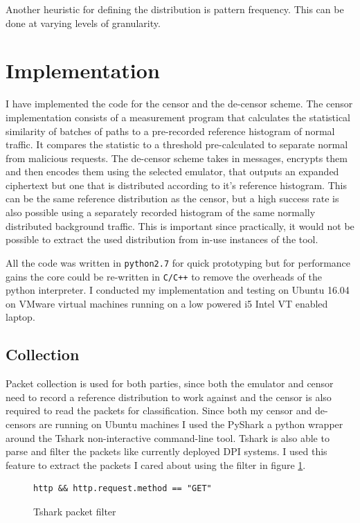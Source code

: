 \documentclass[10pt,a4paper]{article}
\begin{document}
Another heuristic for defining the distribution is pattern frequency. This can be done at varying levels of granularity. 

\pagebreak
\section{Implementation}


I have implemented the code for the censor and the de-censor scheme. The censor implementation consists of a measurement program that calculates the statistical similarity of batches of paths to a pre-recorded reference histogram of normal traffic. It compares the statistic to a threshold pre-calculated to separate normal from malicious requests. The de-censor scheme takes in messages, encrypts them and then encodes them using the selected emulator, that outputs an expanded ciphertext but one that is distributed according to it's reference histogram. This can be the same reference distribution as the censor, but a high success rate is also possible using a separately recorded histogram of the same normally distributed background traffic. This is important since practically, it would not be possible to extract the used distribution from in-use instances of the tool.


All the code was written in \texttt{python2.7} for quick prototyping but for performance gains the core could be re-written in \texttt{C/C++} to remove the overheads of the python interpreter. I conducted my implementation and testing on Ubuntu 16.04 on VMware virtual machines running on a low powered i5 Intel VT enabled laptop.

\subsection{Collection}

Packet collection is used for both parties, since both the emulator and censor need to record a reference distribution to work against and the censor is also required to read the packets for classification. Since both my censor and de-censors are running on Ubuntu machines I used the PyShark a python wrapper around the Tshark non-interactive command-line tool. Tshark is also able to parse and filter the packets like currently deployed DPI systems. I used this feature to extract the packets I cared about using the filter in figure \ref{fig:filter}.

\begin{figure}[h]
\begin{verbatim}
http && http.request.method == "GET"
\end{verbatim}
\caption{Tshark packet filter}
\label{fig:filter}
\end{figure}
\end{document}
